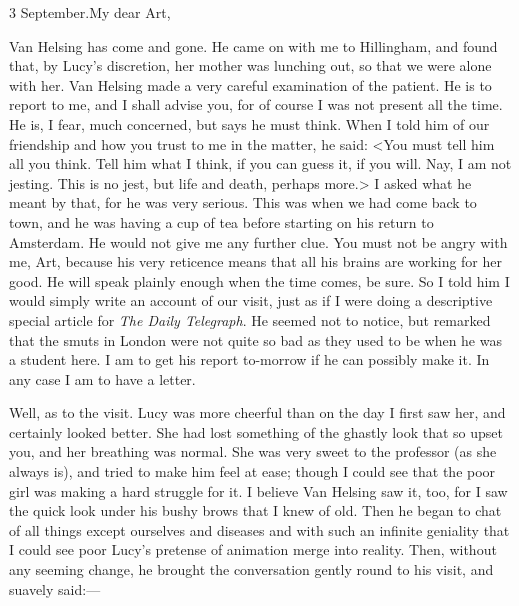 \begin{mail}{3 September.}{My dear Art,}

Van Helsing has come and gone. He came on with me to Hillingham, and found that, by Lucy's discretion, her mother was lunching out, so that we were alone with her. Van Helsing made a very careful examination of the patient. He is to report to me, and I shall advise you, for of course I was not present all the time. He is, I fear, much concerned, but says he must think. When I told him of our friendship and how you trust to me in the matter, he said: <You must tell him all you think. Tell him what I think, if you can guess it, if you will. Nay, I am not jesting. This is no jest, but life and death, perhaps more.> I asked what he meant by that, for he was very serious. This was when we had come back to town, and he was having a cup of tea before starting on his return to Amsterdam. He would not give me any further clue. You must not be angry with me, Art, because his very reticence means that all his brains are working for her good. He will speak plainly enough when the time comes, be sure. So I told him I would simply write an account of our visit, just as if I were doing a descriptive special article for \textit{The Daily Telegraph}. He seemed not to notice, but remarked that the smuts in London were not quite so bad as they used to be when he was a student here. I am to get his report to-morrow if he can possibly make it. In any case I am to have a letter.

Well, as to the visit. Lucy was more cheerful than on the day I first saw her, and certainly looked better. She had lost something of the ghastly look that so upset you, and her breathing was normal. She was very sweet to the professor (as she always is), and tried to make him feel at ease; though I could see that the poor girl was making a hard struggle for it. I believe Van Helsing saw it, too, for I saw the quick look under his bushy brows that I knew of old. Then he began to chat of all things except ourselves and diseases and with such an infinite geniality that I could see poor Lucy's pretense of animation merge into reality. Then, without any seeming change, he brought the conversation gently round to his visit, and suavely said:—


\end{mail}
